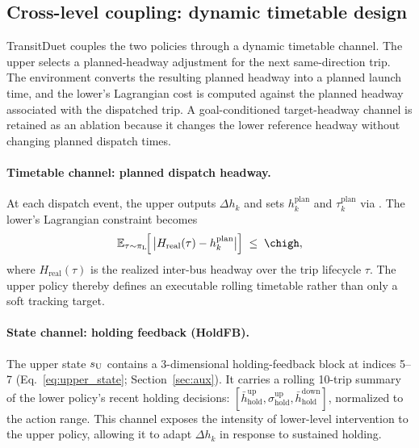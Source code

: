 \subsection{Cross-level coupling: dynamic timetable design}
\label{sec:tap}

TransitDuet couples the two policies through a dynamic timetable channel. The upper selects a planned-headway adjustment for the next same-direction trip. The environment converts the resulting planned headway into a planned launch time, and the lower's Lagrangian cost is computed against the planned headway associated with the dispatched trip. A goal-conditioned target-headway channel is retained as an ablation because it changes the lower reference headway without changing planned dispatch times.

\paragraph{Timetable channel: planned dispatch headway.}
At each dispatch event, the upper outputs $\Delta h_k$ and sets $h^{\mathrm{plan}}_k$ and $\tau^{\mathrm{plan}}_k$ via . The lower's Lagrangian constraint becomes
\begin{equation}
\label{eq:goal_constraint}
    \E_{\tau \sim \pi_{\mathrm{L}}}\!\!\left[\,\big|H_{\mathrm{real}}(\tau) - h^{\mathrm{plan}}_k\big|\right] \;\leq\; \chigh,
\end{equation}
where $H_{\mathrm{real}}(\tau)$ is the realized inter-bus headway over the trip lifecycle $\tau$. The upper policy thereby defines an executable rolling timetable rather than only a soft tracking target.

\paragraph{State channel: holding feedback (HoldFB).}
The upper state $s_{\mathrm{U}}$ contains a 3-dimensional holding-feedback block at indices 5--7 (Eq.~\ref{eq:upper_state}; Section~\ref{sec:aux}). It carries a rolling 10-trip summary of the lower policy's recent holding decisions: $[\bar{h}^{\mathrm{up}}_{\mathrm{hold}}, \sigma^{\mathrm{up}}_{\mathrm{hold}}, \bar{h}^{\mathrm{down}}_{\mathrm{hold}}]$, normalized to the action range. This channel exposes the intensity of lower-level intervention to the upper policy, allowing it to adapt $\Delta h_k$ in response to sustained holding.

